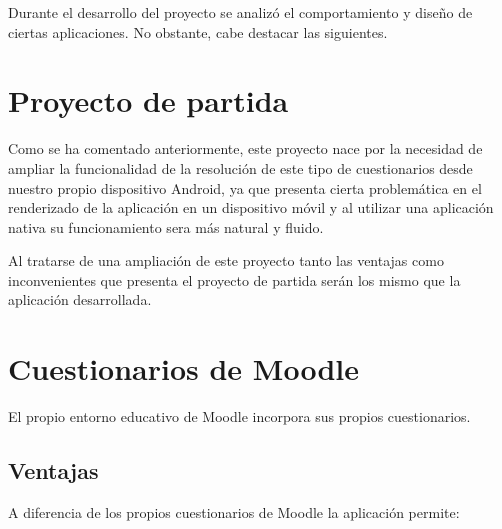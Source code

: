 
Durante el desarrollo del proyecto se analizó el comportamiento y diseño de ciertas aplicaciones. No obstante, cabe destacar las siguientes.

\section{Proyecto de partida}

Como se ha comentado anteriormente, este proyecto nace por la necesidad de ampliar la funcionalidad de la resolución de este tipo de cuestionarios desde nuestro propio dispositivo Android, ya que presenta cierta problemática en el renderizado de la aplicación en un dispositivo móvil y al utilizar una aplicación nativa su funcionamiento sera más natural y fluido.

Al tratarse de una ampliación de este proyecto tanto las ventajas como inconvenientes que presenta el proyecto de partida serán los mismo que la aplicación desarrollada.


\section{Cuestionarios de Moodle}

El propio entorno educativo de Moodle incorpora sus propios cuestionarios. 

\subsection{Ventajas}

A diferencia de los propios cuestionarios de Moodle la aplicación permite:

